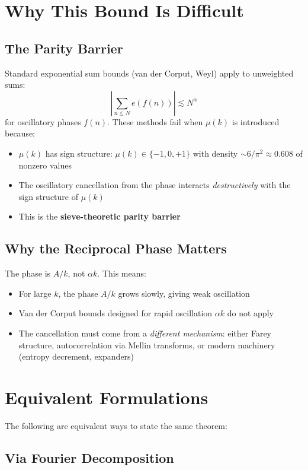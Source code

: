 \documentclass[11pt,a4paper]{article}
\begin{document}
\section{Why This Bound Is Difficult}

\subsection{The Parity Barrier}

Standard exponential sum bounds (van der Corput, Weyl) apply to unweighted sums:
\[
\left| \sum_{n \le N} e(f(n)) \right| \lesssim N^{\alpha}
\]
for oscillatory phases $f(n)$. These methods fail when $\mu(k)$ is introduced because:

\begin{itemize}
\item $\mu(k)$ has sign structure: $\mu(k) \in \{-1, 0, +1\}$ with density $\sim 6/\pi^2 \approx 0.608$ of nonzero values
\item The oscillatory cancellation from the phase interacts \emph{destructively} with the sign structure of $\mu(k)$
\item This is the \textbf{sieve-theoretic parity barrier}
\end{itemize}

\subsection{Why the Reciprocal Phase Matters}

The phase is $A/k$, not $\alpha k$. This means:
\begin{itemize}
\item For large $k$, the phase $A/k$ grows slowly, giving weak oscillation
\item Van der Corput bounds designed for rapid oscillation $\alpha k$ do not apply
\item The cancellation must come from a \emph{different mechanism}: either Farey structure, autocorrelation via Mellin transforms, or modern machinery (entropy decrement, expanders)
\end{itemize}

\section{Equivalent Formulations}

The following are equivalent ways to state the same theorem:

\subsection{Via Fourier Decomposition}
\end{document}
